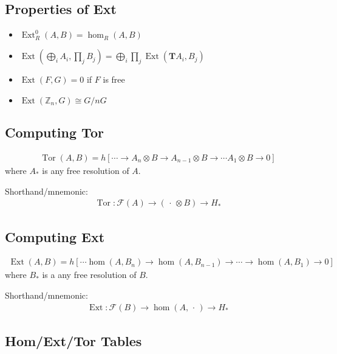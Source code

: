 \hypertarget{properties-of-ext}{%
\subsection{Properties of Ext}\label{properties-of-ext}}

\begin{itemize}
\tightlist
\item
  \(\operatorname{Ext} _R^0(A, B) = \hom_R(A, B)\)
\item
  \(\operatorname{Ext} (\bigoplus_i A_i, \prod_j B_j) = \bigoplus_i \prod_j \operatorname{Ext} (\mathbf{T}A_i, B_j)\)
\item
  \(\operatorname{Ext} (F, G) = 0\) if \(F\) is free
\item
  \(\operatorname{Ext} ({\mathbb{Z}}_n, G) \cong G/nG\)
\end{itemize}

\hypertarget{computing-tor}{%
\subsection{Computing Tor}\label{computing-tor}}

\begin{align*}
\operatorname{Tor}(A, B) = h[\cdots \to A_n \otimes B \to A_{n-1}\otimes B \to \cdots A_1\otimes B \to 0]
\end{align*}
where \(A_*\) is any free resolution of \(A\).

Shorthand/mnemonic:
\begin{align*}
\operatorname{Tor}: \mathcal{F}(A) \to ({\,\cdot\,}\otimes B) \to H_*
\end{align*}

\hypertarget{computing-ext}{%
\subsection{Computing Ext}\label{computing-ext}}

\begin{align*}
\operatorname{Ext} (A, B) = h[\cdots \hom(A, B_n) \to \hom(A, B_{n-1}) \to \cdots \to \hom(A, B_1) \to 0 ]
\end{align*}
where \(B_*\) is a any free resolution of \(B\).

Shorthand/mnemonic:
\begin{align*}
\operatorname{Ext} : \mathcal{F}(B) \to \hom(A, {\,\cdot\,}) \to H_*
\end{align*}

\hypertarget{homexttor-tables}{%
\subsection{Hom/Ext/Tor Tables}\label{homexttor-tables}}

